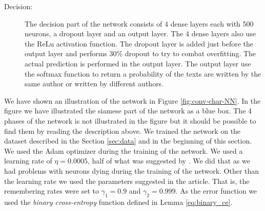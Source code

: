\begin{description}
    \item[Decision:]

        The decision part of the network consists of 4 dense layers each with
        500 neurons, a dropout layer and an output layer. The 4 dense layers
        also use the \gls{ReLu} activation function. The dropout layer is added
        just before the output layer and performs 30\% dropout to try to combat
        overfitting. The actual prediction is performed in the output layer. The
        output layer use the softmax function to return a probability of the
        texts are written by the same author or written by different authors.

\end{description}

We have shown an illustration of the network in Figure \ref{fig:conv-char-NN}.
In the figure we have illustrated the siamese part of the network as a blue
box. The 4 phases of the network is not illustrated in the figure but it
should be possible to find them by reading the description above. We trained
the network on the dataset described in the Section \ref{sec:data} and in
the beginning of this section. We used the \gls{Adam} optimizer during the
training of the network. We used a learning rate of $\eta = 0.0005$, half of
what was suggested by \citet{DBLP:journals/corr/KingmaB14}. We did that as we
had problems with neurons dying during the training of the network. Other than
the learning rate we used the parameters suggested in the article. That is, the
remembering rates were set to $\gamma_1 = 0.9$ and $\gamma_2 = 0.999$. As the
error function we used the \textit{binary cross-entropy} function defined in
Lemma \eqref{eq:binary_ce}.

